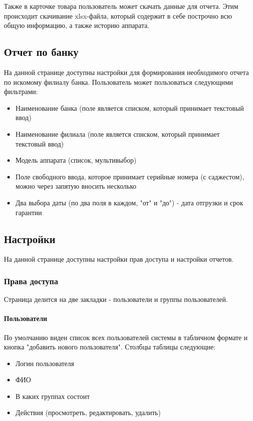 \documentclass[DIV=calc, paper=a4, fontsize=11pt]{scrartcl} %
\begin{document}
Также в карточке товара пользователь может скачать данные для отчета. Этим происходит скачивание xlsx-файла, который содержит в себе построчно всю общую информацию, а также историю аппарата.

\subsection{Отчет по банку}
На данной странице доступны настройки для формирования необходимого отчета по искомому филиалу банка. Пользователь может пользоваться следующими фильтрами:

\begin{itemize}
	\item Наименование банка (поле является списком, который принимает текстовый ввод)
	\item Наименование филиала (поле является списком, который принимает текстовый ввод)
	\item Модель аппарата (список, мультивыбор)
	\item Поле свободного ввода, которое принимает серийные номера (с саджестом), можно через запятую вносить несколько
	\item Два выбора даты (по два поля в каждом, "от" и "до") - дата отгрузки и срок гарантии
\end{itemize}

\subsection{Настройки}

На данной странице доступны настройки прав доступа и настройки отчетов.

\subsubsection{Права доступа}

Страница делится на две закладки - пользователи и группы пользователей.

\paragraph{Пользователи}

По умолчанию виден список всех пользователей системы в табличном формате и кнопка "добавить нового пользователя". Столбцы таблицы следующие:

\begin{itemize}
	\item Логин пользователя
	\item ФИО
	\item В каких группах состоит
	\item Действия (просмотреть, редактировать, удалить)
\end{itemize}
\end{document}
